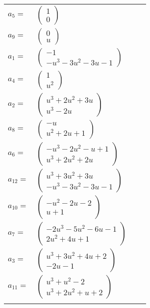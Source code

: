 \documentclass[1p]{elsarticle_modified}
\theoremstyle{definition}
\begin{document}
\begin{tabular}{m{7pt} m{180pt} m{7pt} m{180pt} }
\flushright $a_{5}=$&$\begin{pmatrix}1\\0\end{pmatrix}$ \\
\flushright $a_{9}=$&$\begin{pmatrix}0\\u\end{pmatrix}$ \\
\flushright $a_{1}=$&$\begin{pmatrix}-1\\- u^3-3 u^2-3 u-1\end{pmatrix}$ \\
\flushright $a_{4}=$&$\begin{pmatrix}1\\u^2\end{pmatrix}$ \\
\flushright $a_{2}=$&$\begin{pmatrix}u^3+2 u^2+3 u\\u^3-2 u\end{pmatrix}$ \\
\flushright $a_{8}=$&$\begin{pmatrix}- u\\u^2+2 u+1\end{pmatrix}$ \\
\flushright $a_{6}=$&$\begin{pmatrix}- u^3-2 u^2- u+1\\u^3+2 u^2+2 u\end{pmatrix}$ \\
\flushright $a_{12}=$&$\begin{pmatrix}u^3+3 u^2+3 u\\- u^3-3 u^2-3 u-1\end{pmatrix}$ \\
\flushright $a_{10}=$&$\begin{pmatrix}- u^2-2 u-2\\u+1\end{pmatrix}$ \\
\flushright $a_{7}=$&$\begin{pmatrix}-2 u^3-5 u^2-6 u-1\\2 u^2+4 u+1\end{pmatrix}$ \\
\flushright $a_{3}=$&$\begin{pmatrix}u^3+3 u^2+4 u+2\\-2 u-1\end{pmatrix}$ \\
\flushright $a_{11}=$&$\begin{pmatrix}u^3+u^2-2\\u^3+2 u^2+u+2\end{pmatrix}$\\&\end{tabular}
\end{document}
